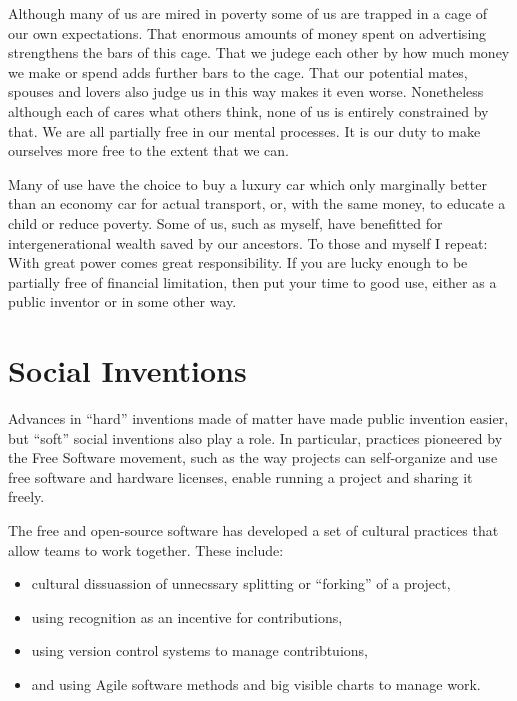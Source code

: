 \documentclass[
	fontsize=10pt, %
	twoside=false, %
	secnumdepth=1, %
]{kaobook}
\begin{document}
Although many of us are mired in poverty some of us are trapped in a cage of our own
expectations.
That enormous amounts of money spent
on advertising strengthens the bars of this cage.
That we judege each other by how much money we make
or spend adds further bars to the cage.
That our potential mates, spouses and lovers also judge
us in this way makes it even worse.
Nonetheless although each of cares what others think,
none of us is entirely constrained by that.
We are all partially free in our mental processes.
It is our duty to make ourselves more free to the extent that we can.

Many of use have the choice to buy a luxury car
which only marginally better than an economy car
for actual transport, or, with the same money,
to educate a child or reduce poverty.
Some of us, such as myself, have benefitted for intergenerational
wealth saved by our ancestors.
To those and myself I repeat: With great
power comes great responsibility.
If you are lucky enough to be
partially free of financial limitation, then put your time to good
use, either as a public inventor or in some other way.

\chapter{Social Inventions}

Advances in ``hard'' inventions made of matter
have made public invention easier,
but ``soft'' social inventions also play a role.
In particular, practices pioneered by the Free Software movement,
such as the way projects can self-organize and use
free software and hardware licenses, enable running a
project and sharing it freely.

The free and open-source software has developed a set of cultural
practices that allow teams to work together.  These include:
\begin{itemize}
\item cultural dissuassion of unnecssary splitting or ``forking'' of a
  project,
\item using recognition as an incentive for contributions,
\item using version control systems to manage contribtuions,
\item and using Agile software methods and big visible charts to
  manage work.
\end{itemize}
\end{document}
